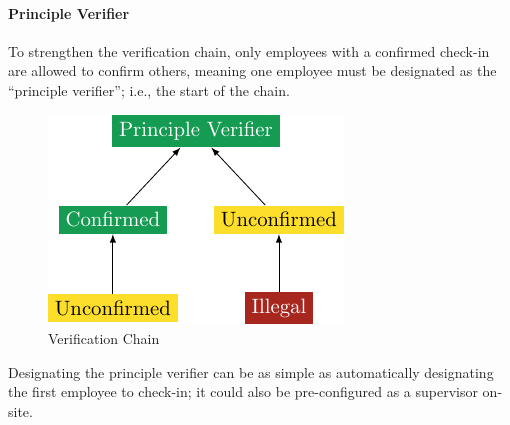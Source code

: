 \paragraph{Principle Verifier}

To strengthen the verification chain, only employees with a
confirmed check-in are allowed to confirm others, meaning
one employee must be designated as the \enquote{principle
  verifier}; i.e., the start of the chain.

\begin{figure}[h]
  \centering
  \includegraphics{05 design/assets/verification tree.pdf}
  \caption{Verification Chain}
  \label{fig:verificationTree}
\end{figure}

Designating the principle verifier can be as simple as
automatically designating the first employee to check-in;
it could also be pre-configured as a supervisor on-site.


